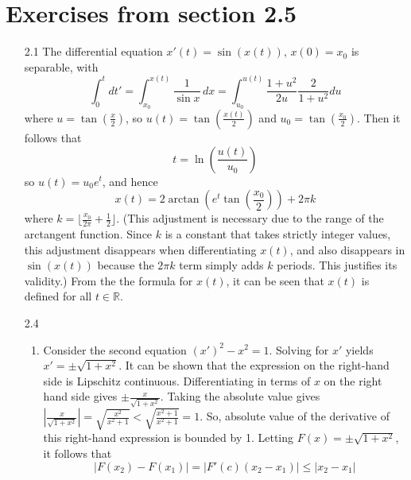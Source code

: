 \documentclass{exam}
\begin{document}
\section{Exercises from section 2.5}
\begin{enumerate}
    \item[2.1] The differential equation $x'(t) = \sin(x(t))\text{, }x(0) = x_0$ is separable, with
    \begin{equation*}
        \int_{0}^{t}dt' = \int_{x_0}^{x(t)}\frac{1}{\sin{x}}\,dx = \int_{u_0}^{u(t)}\frac{1+u^2}{2u}\frac{2}{1+u^2}du
    \end{equation*}
    where $u = \tan\left(\frac{x}{2}\right)$, so $u(t) = \tan\left(\frac{x(t)}{2}\right)$ and $u_0 = \tan\left(\frac{x_0}{2}\right)$. Then it follows that
    \begin{equation*}
        t = \ln{\left(\frac{u(t)}{u_0}\right)}
    \end{equation*}
    so $u(t) = u_0e^t$, and hence
    \begin{equation*}
        x(t) = 2\arctan\left(e^t\tan\left(\frac{x_0}{2}\right)\right) + 2\pi k
    \end{equation*}
    where $k = \lfloor\frac{x_0}{2\pi}+\frac{1}{2}\rfloor$. (This adjustment is necessary due to the range of the arctangent function. Since $k$ is a constant that takes strictly integer values, this adjustment disappears when differentiating $x(t)$, and also disappears in $\sin(x(t))$ because the $2\pi k$ term simply adds $k$ periods. This justifies its validity.) From the the formula for $x(t)$, it can be seen that $x(t)$ is defined for all $t \in \mathbb{R}$.
    \item[2.4]\begin{enumerate}
        \item Consider the second equation $\left(x'\right)^2-x^2=1$. Solving for $x'$ yields $x' = \pm\sqrt{1+x^2}$. It can be shown that the expression on the right-hand side is Lipschitz continuous. Differentiating in terms of $x$ on the right hand side gives $\pm\frac{x}{\sqrt{1+x^2}}$. Taking the absolute value gives $\left|\frac{x}{\sqrt{1+x^2}}\right| = \sqrt{\frac{x^2}{x^2+1}} < \sqrt{\frac{x^2+1}{x^2+1}} = 1$. So, absolute value of the derivative of this right-hand expression is bounded by 1. Letting $F(x) = \pm\sqrt{1+x^2}$, it follows that
        \begin{equation*}
            \left|F(x_2) - F(x_1)\right| = \left|F'(c)\left(x_2-x_1\right)\right| \leq \left|x_2-x_1\right|
        \end{equation*}

\end{enumerate}
\end{enumerate}
\end{document}
